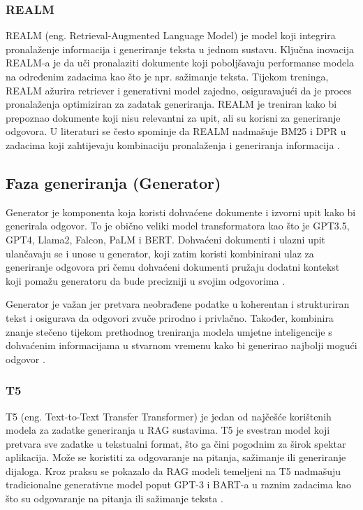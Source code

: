 \documentclass[]{foi}
\begin{document}
\subsubsection{REALM}
REALM (eng. Retrieval-Augmented Language Model) je model koji integrira pronalaženje informacija i generiranje teksta u jednom sustavu.
Ključna inovacija REALM-a je da uči pronalaziti dokumente koji poboljšavaju performanse modela na određenim zadacima kao što je npr.
sažimanje teksta. Tijekom treninga, REALM ažurira retriever i generativni model zajedno, osiguravajući da je proces pronalaženja optimiziran
za zadatak generiranja. REALM je treniran kako bi prepoznao dokumente koji nisu relevantni za upit, ali su korisni za generiranje odgovora.
U literaturi se često spominje da REALM nadmašuje BM25 i DPR u zadacima koji zahtijevaju kombinaciju pronalaženja i generiranja informacija \cite{gupta2024rag}.

\subsection{Faza generiranja (Generator)}

Generator je komponenta koja koristi dohvaćene dokumente i izvorni upit kako bi generirala odgovor. To je obično veliki model transformatora kao što je GPT3.5, GPT4, Llama2, Falcon, PaLM i BERT.
Dohvaćeni dokumenti i ulazni upit ulančavaju se i unose u generator, koji zatim koristi kombinirani ulaz za generiranje odgovora pri čemu dohvaćeni dokumenti pružaju dodatni kontekst
koji pomažu generatoru da bude precizniji u svojim odgovorima \cite{redis2025}. 

Generator je važan jer pretvara neobrađene podatke u koherentan i strukturiran tekst i osigurava da odgovori zvuče prirodno i privlačno. Također, kombinira znanje stečeno tijekom prethodnog treniranja modela
umjetne inteligencije s dohvaćenim informacijama u stvarnom vremenu kako bi generirao najbolji mogući odgovor \cite{shaheryar2025}. 

\subsubsection{T5}
T5 (eng. Text-to-Text Transfer Transformer) je jedan od najčešće korištenih modela za zadatke generiranja u RAG sustavima. T5 je svestran model koji pretvara sve zadatke u tekstualni format, što ga čini pogodnim za širok spektar aplikacija.
Može se koristiti za odgovaranje na pitanja, sažimanje ili generiranje dijaloga. Kroz praksu se pokazalo da RAG modeli temeljeni na T5 nadmašuju
tradicionalne generativne model poput GPT-3 i BART-a u raznim zadacima kao što su odgovaranje na pitanja ili sažimanje teksta \cite{gupta2024rag}.
\end{document}
